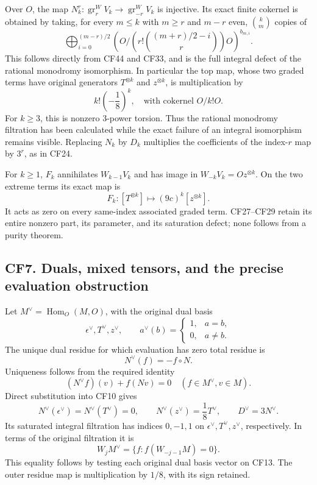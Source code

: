 \documentclass[
  10pt,
]{article}
\begin{document}
Over \(O\), the map
\(N_k^r:\operatorname{gr}_r^WV_k\to\operatorname{gr}_{-r}^WV_k\) is
injective. Its exact finite cokernel is obtained by taking, for every
\(m\leq k\) with \(m\geq r\) and \(m-r\) even, \(\binom km\) copies of
\[
 \bigoplus_{i=0}^{(m-r)/2}
 \left(O\Big/\left(r!\binom{(m+r)/2-i}{r}\right)O\right)^{b_{m,i}}.
 \tag{CF49}
\] This follows directly from CF44 and CF33, and is the full integral
defect of the rational monodromy isomorphism. In particular the top map,
whose two graded terms have original generators \(T^{\otimes k}\) and
\(z^{\otimes k}\), is multiplication by \[
 k!\left(-\frac18\right)^k,
 \quad\text{with cokernel }O/k!O.
 \tag{CF50}
\] For \(k\geq3\), this is nonzero \(3\)-power torsion. Thus the
rational monodromy filtration has been calculated while the exact
failure of an integral isomorphism remains visible. Replacing \(N_k\) by
\(D_k\) multiplies the coefficients of the index-\(r\) map by \(3^r\),
as in CF24.

For \(k\geq1\), \(F_k\) annihilates \(W_{k-1}V_k\) and has image in
\(W_{-k}V_k=Oz^{\otimes k}\). On the two extreme terms its exact map is
\[
 F_k:[T^{\otimes k}]\longmapsto(9c)^k[z^{\otimes k}].
 \tag{CF51}
\] It acts as zero on every same-index associated graded term.
CF27--CF29 retain its entire nonzero part, its parameter, and its
saturation defect; none follows from a purity theorem.

\subsection{CF7. Duals, mixed tensors, and the precise evaluation
obstruction}\label{cf7.-duals-mixed-tensors-and-the-precise-evaluation-obstruction}

Let \(M^\vee=\operatorname{Hom}_O(M,O)\), with the original dual basis
\[
 \epsilon^\vee,T^\vee,z^\vee,
 \qquad a^\vee(b)=\begin{cases}1,&a=b,\\0,&a\neq b.\end{cases}
\] The unique dual residue for which evaluation has zero total residue
is \[
 N^\vee(f)=-f\circ N.
 \tag{CF52}
\] Uniqueness follows from the required identity \[
 (N^\vee f)(v)+f(Nv)=0
 \quad(f\in M^\vee,v\in M).
 \tag{CF53}
\] Direct substitution into CF10 gives \[
 N^\vee(\epsilon^\vee)=N^\vee(T^\vee)=0,
 \qquad N^\vee(z^\vee)=\frac18T^\vee,
 \qquad D^\vee=3N^\vee.
 \tag{CF54}
\] Its saturated integral filtration has indices \(0,-1,1\) on
\(\epsilon^\vee,T^\vee,z^\vee\), respectively. In terms of the original
filtration it is \[
 W_jM^\vee=\{f:f(W_{-j-1}M)=0\}.
 \tag{CF55}
\] This equality follows by testing each original dual basis vector on
CF13. The outer residue map is multiplication by \(1/8\), with its sign
retained.
\end{document}
